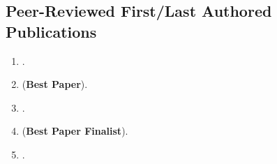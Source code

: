 \documentclass[margin,line]{res}
\begin{document}
\begin{resume}
%
%
\section{\sc Peer-Reviewed First/Last Authored Publications}
\begin{enumerate}
	\item {}.
	\item {} (\textbf{Best Paper}).
	\item {}.
	\item {} (\textbf{Best Paper Finalist}).
	\item {}.


\end{enumerate}
\end{resume}
\end{document}
